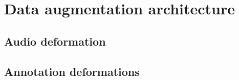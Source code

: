 \documentclass{article}
\begin{document}
\section{Data augmentation architecture}

%
%

\cite{mauch2013audio}

\cite{humphreyjams}

\subsection{Audio deformation}

\subsection{Annotation deformations}
\end{document}
